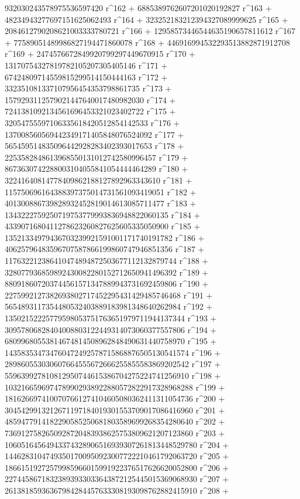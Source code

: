        932030243578975536597420 r^162 + 
       6885389762607201020192827 r^163 + 
       48234943277697151625062493 r^164 + 
       323252183212394327089999625 r^165 + 
       2084612790208621003333780721 r^166 + 
       12958573446544635190657811612 r^167 + 
       77589051489986827194471860078 r^168 + 
       446916994532293513882871912708 r^169 + 
       2474576672849920799297449670915 r^170 + 
       13170754327819782105207305405146 r^171 + 
       67424809714559815299514150444163 r^172 + 
       332351081337107956454353798861735 r^173 + 
       1579293112579021447640017480982030 r^174 + 
       7241381092134561696453321023402722 r^175 + 
       32054755597106335618420512854142533 r^176 + 
       137008560569442349171405848076524092 r^177 + 
       565459514835096442928283402393017653 r^178 + 
       2253582848613968550131012742580996457 r^179 + 
       8673630742288003104055841054444464289 r^180 + 
       32241640814778409862188127892963343610 r^181 + 
       115750696164388397375014731561093419051 r^182 + 
       401300886739828932452819014613085711477 r^183 + 
       1343222759250719753779993836948822060135 r^184 + 
       4339071680411278623260827625605335050900 r^185 + 
       13521334979436703239921591001171740191782 r^186 + 
       40625796483596707587866199860747946851356 r^187 + 
       117632212386410474894872503677112132879744 r^188 + 
       328077936859892430082280152712650941496392 r^189 + 
       880918607203744561571347889943731692459806 r^190 + 
       2275992127382693802717452295431429485746468 r^191 + 
       5654893117354480532403889183981348640262984 r^192 + 
       13502152225779598053751763651979711944137344 r^193 + 
       30957806828404008803122449314073060377557806 r^194 + 
       68099680553814674814508962848490631440758970 r^195 + 
       143583534734760472492578715868876505130541574 r^196 + 
       289860553030607664555672666255855583869202542 r^197 + 
       559639927810812950744615386704275224741256910 r^198 + 
       1032166596974789902938922880572822917328968288 r^199 + 
       1816266974100707661274104605080362411311054736 r^200 + 
       3045429913212671197184019301553709017086416960 r^201 + 
       4859477914182290585250681803589699268354280640 r^202 + 
       7369127582650928720483938625753809621207123860 r^203 + 
       10605164564943374328906516939307261813448529780 r^204 + 
       14462831047493501700950923007722210461792063720 r^205 + 
       18661519272579985966015991922376517626620052800 r^206 + 
       22744586718323893933033643872125445015369068930 r^207 + 
       26138185936367984284457633308193098762882415910 r^208 + 
